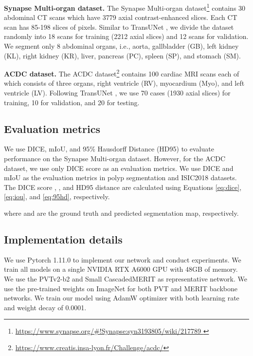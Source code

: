 \documentclass[10pt,twocolumn,letterpaper]{article}
\begin{document}
\textbf{Synapse Multi-organ dataset.} The Synapse Multi-organ dataset\footnote{\href{https://www.synapse.org/\#!Synapse:syn3193805/wiki/217789}{https://www.synapse.org/\#!Synapse:syn3193805/wiki/217789 }} contains 30 abdominal CT scans which have 3779 axial contrast-enhanced slices. Each CT scan has 85-198 slices of  pixels. Similar to TransUNet \cite{chen2021transunet}, we divide the dataset randomly into 18 scans for training (2212 axial slices) and 12 scans for validation. We segment only 8 abdominal organs, i.e., aorta, gallbladder (GB), left kidney (KL), right kidney (KR), liver, pancreas (PC), spleen (SP), and stomach (SM). 

\textbf{ACDC dataset.} The ACDC dataset\footnote{\href{https://www.creatis.insa-lyon.fr/Challenge/acdc/}{https://www.creatis.insa-lyon.fr/Challenge/acdc/}} contains 100 cardiac MRI scans each of which consists of three organs, right ventricle (RV), myocardium (Myo), and left ventricle (LV). Following TransUNet \cite{chen2021transunet}, we use 70 cases (1930 axial slices) for training, 10 for validation, and 20 for testing.


\subsection{Evaluation metrics} 
\label{assec:eval_metrics}

We use DICE, mIoU, and 95\% Hausdorff Distance (HD95) to evaluate performance on the Synapse Multi-organ dataset. However, for the ACDC dataset, we use only DICE score as an evaluation metrics. We use DICE and mIoU as the evaluation metrics in polyp segmentation and ISIC2018 datasets. The DICE score , , and HD95 distance  are calculated using Equations \ref{eq:dice}, \ref{eq:iou}, and \ref{eq:95hd}, respectively.




where  and  are the ground truth and predicted segmentation map, respectively. 



\subsection{Implementation details}
\label{ssec:impl_details}
We use Pytorch 1.11.0 to implement our network and conduct experiments. We train all models on a single NVIDIA RTX A6000 GPU with 48GB of memory. We use the PVTv2-b2 and Small CascadedMERIT as representative network. We use the pre-trained weights on ImageNet for both PVT and MERIT backbone networks. We train our model using AdamW optimizer \cite{loshchilov2017decoupled} with both learning rate and weight decay of 0.0001. 
\end{document}
